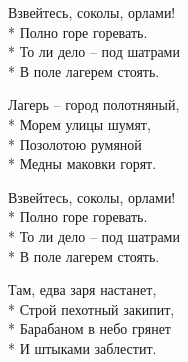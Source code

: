 \medskip

\begin{minipage}{\linewidth}
\hspace*{1.5em}Взвейтесь, соколы, орлами!\\*
\hspace*{1.5em}Полно горе горевать.\\*
\hspace*{1.5em}То ли дело – под шатрами\\*
\hspace*{1.5em}В поле лагерем стоять.\\
\end{minipage}\par\medskip\nobreak

\medskip

\begin{minipage}{\linewidth}
Лагерь – город полотняный,\\*
Морем улицы шумят,\\*
Позолотою румяной\\*
Медны маковки горят.\\
\end{minipage}\par\medskip\nobreak

\medskip

\begin{minipage}{\linewidth}
\hspace*{1.5em}Взвейтесь, соколы, орлами!\\*
\hspace*{1.5em}Полно горе горевать.\\*
\hspace*{1.5em}То ли дело – под шатрами\\*
\hspace*{1.5em}В поле лагерем стоять.\\
\end{minipage}\par\medskip\nobreak

\medskip

\begin{minipage}{\linewidth}
Там, едва заря настанет,\\*
Строй пехотный закипит,\\*
Барабаном в небо грянет\\*
И штыками заблестит.\\
\end{minipage}\par\medskip\nobreak

\medskip

